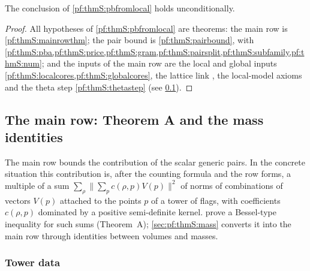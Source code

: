 \begin{theorem}\label{pf:thmS:pbapplied}
The conclusion of \cref{pf:thmS:pbfromlocal} holds unconditionally.
\end{theorem}

\begin{proof}
All hypotheses of \cref{pf:thmS:pbfromlocal} are theorems: the main row is \cref{pf:thmS:mainrowthm}; the pair bound
is \cref{pf:thmS:pairbound}, with \cref{pf:thmS:pba,pf:thmS:price,pf:thmS:gram,pf:thmS:pairsplit,pf:thmS:subfamily,pf:thmS:num};
and the inputs of the main row are the local and global inputs
\cref{pf:thmS:localcores,pf:thmS:globalcores},
the lattice link , the local-model axioms
 and the theta step
\cref{pf:thmS:thetastep} (see \cref{sec:pf:thmS:main}).
\end{proof}

\subsection{The main row: Theorem A and the mass identities}\label{sec:pf:thmS:main}

The main row bounds the contribution of the scalar generic pairs. In the concrete situation this contribution is,
after the counting formula and the row forms, a multiple of a sum $\sum_\rho\|\sum_pc(\rho,p)V(p)\|^2$ of norms of
combinations of vectors $V(p)$ attached to the points $p$ of a tower of flags, with coefficients $c(\rho,p)$ dominated
by a positive semi-definite kernel.  prove a Bessel-type
inequality for such sums (Theorem~A); \cref{sec:pf:thmS:mass} converts it into the main row through identities
between volumes and masses.

\subsubsection{Tower data}\label{sec:pf:thmS:tbdef}

